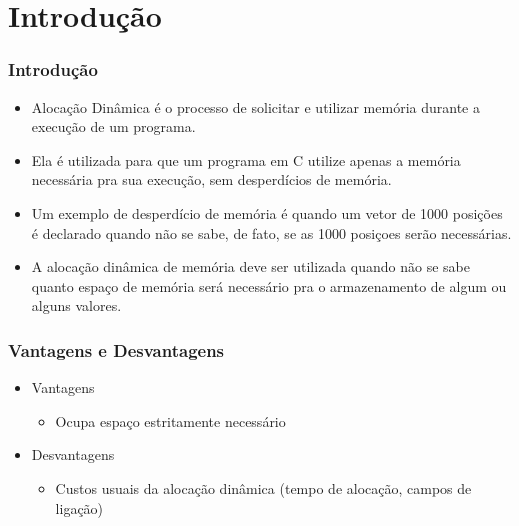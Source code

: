 \documentclass[aspectratio=169]{beamer}
\begin{document}
% 
%     
%     
%   
\section{Introdução} %

\begin{frame}
\frametitle{Introdução}
\begin{itemize}
 \item Alocação Dinâmica é o processo de solicitar e utilizar memória durante a execução de um programa. 
 \item Ela é utilizada para que um programa em C utilize apenas a memória necessária pra sua execução, sem desperdícios de memória. 
 \item Um exemplo de desperdício de memória é quando um vetor de 1000 posições é declarado quando não se sabe, de fato, se as 1000 posiçoes serão necessárias.
 \item A alocação dinâmica de memória deve ser utilizada quando não se sabe quanto espaço de memória será necessário pra o armazenamento de algum ou alguns valores. 
\end{itemize}
\end{frame}

\begin{frame}
\frametitle{Vantagens e Desvantagens}
\begin{itemize}
 \item Vantagens
 \begin{itemize}
 \item Ocupa espaço estritamente necessário
 \end{itemize}
 \item Desvantagens
 \begin{itemize}
 \item Custos usuais da alocação dinâmica (tempo de alocação, campos de ligação)
 \end{itemize} 
\end{itemize}
\end{frame}
\end{document}
